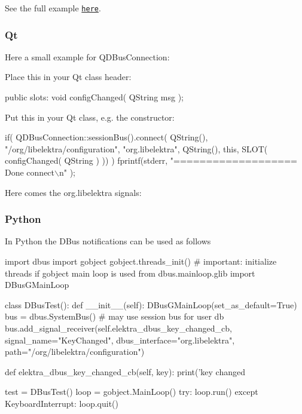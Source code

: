 See the full example \href{/home/markus/Projekte/Elektra/current/src/plugins/dbus/receivemessage.c}{\tt here}.

\subsubsection*{Qt}

Here a small example for Q\+D\+Bus\+Connection\+:

Place this in your Qt class header\+:


\begin{DoxyCode}
\textcolor{keyword}{public} slots:
  \textcolor{keywordtype}{void} configChanged( QString msg );
\end{DoxyCode}


Put this in your Qt class, e.\+g. the constructor\+:


\begin{DoxyCode}
\textcolor{keywordflow}{if}( QDBusConnection::sessionBus().connect( QString(), \textcolor{stringliteral}{"/org/libelektra/configuration"}, \textcolor{stringliteral}{"org.libelektra"}, 
      QString(),
                                       \textcolor{keyword}{this}, SLOT( configChanged( QString ) )) )
    fprintf(stderr, \textcolor{stringliteral}{"=================== Done connect\(\backslash\)n"} );
\end{DoxyCode}


Here comes the org.\+libelektra signals\+:




\subsubsection*{Python}

In Python the D\+Bus notifications can be used as follows


\begin{DoxyCode}
import dbus
import gobject
gobject.threads\_init()  # important: initialize threads if gobject main loop is used
from dbus.mainloop.glib import DBusGMainLoop

class DBusTest():
    def \_\_init\_\_(self):
        DBusGMainLoop(set\_as\_default=True)
        bus = dbus.SystemBus()  # may use session bus for user db
        bus.add\_signal\_receiver(self.elektra\_dbus\_key\_changed\_cb,
            signal\_name="KeyChanged",
            dbus\_interface="org.libelektra",
            path="/org/libelektra/configuration")

    def elektra\_dbus\_key\_changed\_cb(self, key):
        print('key changed %

test = DBusTest()
loop = gobject.MainLoop()
try:
    loop.run()
except KeyboardInterrupt:
    loop.quit()
\end{DoxyCode}


